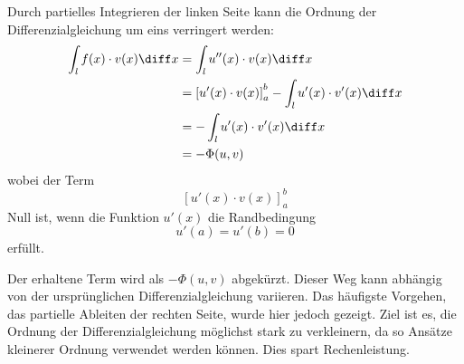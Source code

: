 Durch partielles Integrieren der linken Seite kann die Ordnung der Differenzialgleichung um eins verringert werden:
\begin{align}
    \int_l f(x) \cdot v(x) \diff x &= \int_l u''(x) \cdot v(x) \diff x \\
                                 &= \left[ u'(x) \cdot v(x) \right]_{a}^{b} - \int_l u'(x) \cdot v'(x) \diff x \\
                                 &= - \int_l u'(x) \cdot v'(x) \diff x \\
                                 &= - \Phi(u, v)
\end{align}
wobei der Term
\begin{equation}
    \left[ u'(x) \cdot v(x) \right]_{a}^{b}
\end{equation}
Null ist, wenn die Funktion $u'(x)$ die Randbedingung
\begin{equation}
    u'(a) = u'(b) = 0
\end{equation}
erfüllt. 

Der erhaltene Term wird als $-\Phi(u, v)$ abgekürzt.
Dieser Weg kann abhängig von der ursprünglichen Differenzialgleichung variieren.
Das häufigste Vorgehen, das partielle Ableiten der rechten Seite, wurde hier jedoch gezeigt.
Ziel ist es, die Ordnung der Differenzialgleichung möglichst stark zu verkleinern, da so Ansätze kleinerer Ordnung verwendet werden können.
Dies spart Rechenleistung.


